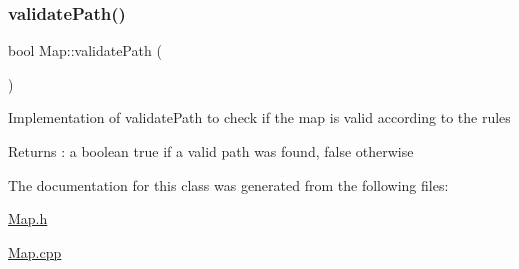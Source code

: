 \subsubsection{\texorpdfstring{validate\+Path()}{validatePath()}}
{\footnotesize\ttfamily bool Map\+::validate\+Path (\begin{DoxyParamCaption}{ }\end{DoxyParamCaption})}

Implementation of validate\+Path to check if the map is valid according to the rules \begin{DoxyReturn}{Returns}
\+: a boolean true if a valid path was found, false otherwise 
\end{DoxyReturn}


The documentation for this class was generated from the following files\+:\begin{DoxyCompactItemize}
\item 
\hyperlink{_map_8h}{Map.\+h}\item 
\hyperlink{_map_8cpp}{Map.\+cpp}\end{DoxyCompactItemize}
